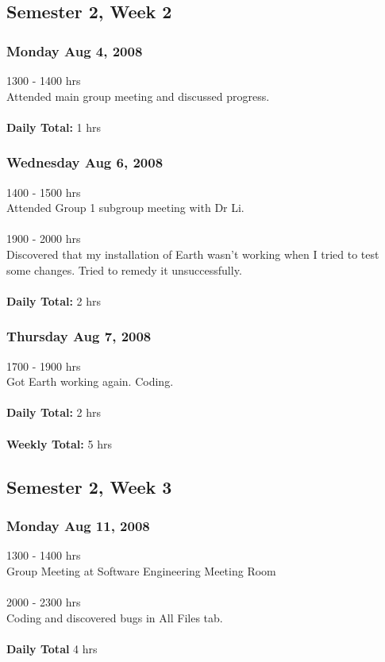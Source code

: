 \documentclass[10pt,a4,oneside]{article}
\begin{document}
\subsection*{Semester 2, Week 2}
\subsubsection*{Monday Aug 4, 2008}
1300 - 1400 hrs\\
Attended main group meeting and discussed progress.\\
\\
\textbf{Daily Total:} 1 hrs

\subsubsection*{Wednesday Aug 6, 2008}
1400 - 1500 hrs\\
Attended Group 1 subgroup meeting with Dr Li.\\
\\
1900 - 2000 hrs\\
Discovered that my installation of Earth wasn't working when I tried to test some changes. Tried to remedy it unsuccessfully.\\
\\
\textbf{Daily Total:} 2 hrs\\

\subsubsection*{Thursday Aug 7, 2008}
1700 - 1900 hrs\\
Got Earth working again. Coding.\\
\\
\textbf{Daily Total:} 2 hrs\\
\\
\textbf{Weekly Total:} 5 hrs

\subsection*{Semester 2, Week 3}
\subsubsection*{Monday Aug 11, 2008}
1300 - 1400 hrs\\
Group Meeting at Software Engineering Meeting Room\\
\\
2000 - 2300 hrs\\
Coding and discovered bugs in All Files tab.\\
\\
\textbf{Daily Total} 4 hrs\\
\end{document}
